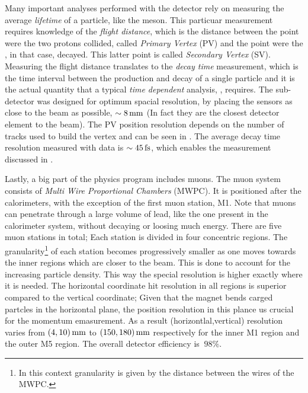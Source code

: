 Many important analyses performed with the \lhcb detector rely on measuring the average {\it lifetime} of a particle,
like the \Bs meson. This particuar measurement requires knowledge of the {\it flight distance}, which is the
distance between the point were the two protons collided, called {\it Primary Vertex} (PV) and the point were the
\Bs, in that case, decayed. This latter point is called {\it Secondary Vertex} (SV). Measuring the flight distance
translates to the {\it decay time} measurement, which is the time interval between the production and decay of a
single particle and it is the actual quantity that a typical {\it time dependent} analysis, \eg \BsJpsiPhi, requires.
The \velo sub-detector was designed for optimum spacial resolution, by placing the \velo sensors as close to the beam
as possible, $\sim 8 \rm \,mm$ (In fact they are the closest detector element to the \lhcb beam).  
The PV position resolution depends on the number of tracks used to build the vertex and can
be seen in . The average decay time resolution measured with \BsJpsiPhi data is $\sim 45\rm \,fs$,
which enables the \phis measurement discussed in .

Lastly, a big part of the \lhcb physics program includes muons. The muon system consists of {\it Multi Wire Proportional Chambers}
(MWPC). It is positioned after the calorimeters, with the exception of the first muon station, M1.
Note that muons can penetrate through a large volume of lead, like the one present in the calorimeter system,
without decaying or loosing much energy. There are five muon stations in total; Each station is divided in four concentric
regions. The granularity\footnote{In this context granularity is given by the distance between the wires of the MWPC.}
of each station becomes progressively smaller as one moves towards the inner regions which are closer to the beam.
This is done to account for the increasing particle density. This way the special resolution is higher exactly where
it is needed. The horizontal coordinate hit resolution in all regions is superior compared to the vertical coordinate;
Given that the \lhcb magnet bends carged partcles in the horizontal plane, the position resolution in this plance
us crucial for the momentum emasurement. As a result (horizontlal,vertical) resolution varies from $(4,10)\rm \,mm$ to
$(150,180)\rm \,mm$ respectively for the inner M1 region and the outer M5 region. The overall detector efficiency is $\>98\%$.
